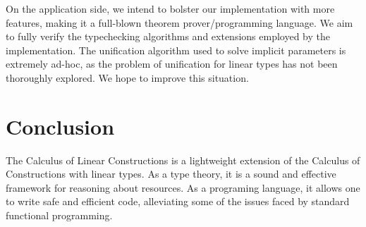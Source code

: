 \documentclass[sigplan,screen]{acmart}
\theoremstyle{definition}
\begin{document}
  On the application side, we intend to bolster our implementation with more features, making it a full-blown theorem prover/programming language. We aim to fully verify the typechecking algorithms and extensions employed by the implementation. The unification algorithm used to solve implicit parameters is extremely ad-hoc, as the problem of unification for linear types has not been thoroughly explored. We hope to improve this situation.

  \section{Conclusion}
  The Calculus of Linear Constructions is a lightweight extension of the Calculus of Constructions with linear types. As a type theory, it is a sound and effective framework for reasoning about resources. As a programing language, it allows one to write safe and efficient code, alleviating some of the issues faced by standard functional programming. 



\end{document}

